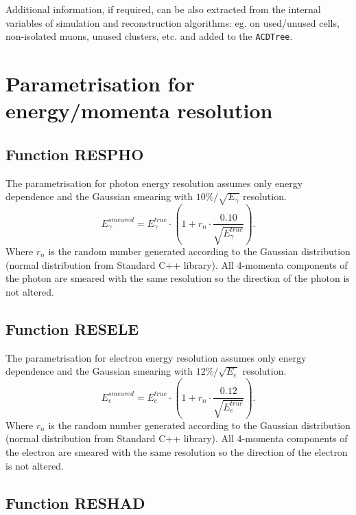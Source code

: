 Additional information, if required, can be also extracted from
the  internal variables of simulation and reconstruction
algorithms: eg. on used/unused cells, non-isolated muons, 
unused clusters, etc. and added to the {\tt ACDTree}.

\section{Parametrisation for energy/momenta resolution}

\subsection{Function RESPHO}

The parametrisation for photon energy resolution assumes only 
energy dependence and the Gaussian
smearing with $10\%/\sqrt{E_{\gamma}}$ resolution.
\begin{equation}
 E_{\gamma}^{smeared}  = 
E_{\gamma}^{true} \cdot (1+ r_n \cdot \frac{0.10}{\sqrt{E_{\gamma}^{true}}}). 
\end{equation}
Where $r_n$ is the random number generated according to the Gaussian
distribution (normal distribution from Standard C++ library).
All 4-momenta components of the photon are smeared with the same
resolution so the direction of the photon is not altered. 

\subsection{Function RESELE}

The parametrisation for electron energy resolution assumes only 
energy dependence and the Gaussian
smearing with $12\%/\sqrt{E_{e}}$ resolution.
\begin{equation}
 E_{e}^{smeared}  = 
E_{e}^{true} \cdot (1+ r_n \cdot \frac{0.12}{\sqrt{E_{e}^{true}}}). 
\end{equation}
Where $r_n$ is the random number generated according to the Gaussian
distribution (normal distribution from Standard C++ library).
All 4-momenta components of the electron are smeared with the same
resolution so the direction of the electron is not altered. 

\subsection{Function RESHAD}

